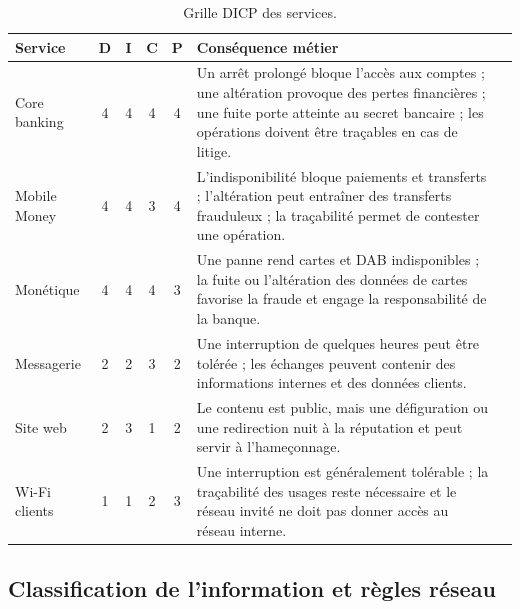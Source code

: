 \documentclass[11pt,a4paper]{article}
\begin{document}
	\small
	\begin{longtable}{p{2.5cm} c c c c p{7.3cm} c}
		\caption{Grille DICP des services.}\\
		\hline
		\textbf{Service} & \textbf{D} & \textbf{I} & \textbf{C} & \textbf{P} & \textbf{Conséquence métier}\\
		\hline
		\endhead
		Core banking & 4 & 4 & 4 & 4 & Un arrêt prolongé bloque l'accès aux comptes ; une altération provoque des pertes financières ; une fuite porte atteinte au secret bancaire ; les opérations doivent être traçables en cas de litige. \\
		\hline
		Mobile Money & 4 & 4 & 3 & 4 & L'indisponibilité bloque paiements et transferts ; l'altération peut entraîner des transferts frauduleux ; la traçabilité permet de contester une opération. \\
		\hline
		Monétique & 4 & 4 & 4 & 3 & Une panne rend cartes et DAB indisponibles ; la fuite ou l'altération des données de cartes favorise la fraude et engage la responsabilité de la banque. \\
		\hline
		Messagerie & 2 & 2 & 3 & 2 & Une interruption de quelques heures peut être tolérée ; les échanges peuvent contenir des informations internes et des données clients. \\
		\hline
		Site web & 2 & 3 & 1 & 2 & Le contenu est public, mais une défiguration ou une redirection nuit à la réputation et peut servir à l'hameçonnage. \\
		\hline
		Wi-Fi clients & 1 & 1 & 2 & 3 & Une interruption est généralement tolérable ; la traçabilité des usages reste nécessaire et le réseau invité ne doit pas donner accès au réseau interne. \\
	\hline
	\end{longtable}
	\normalsize
	
	\subsection{Classification de l'information et règles réseau}
	
\end{document}
